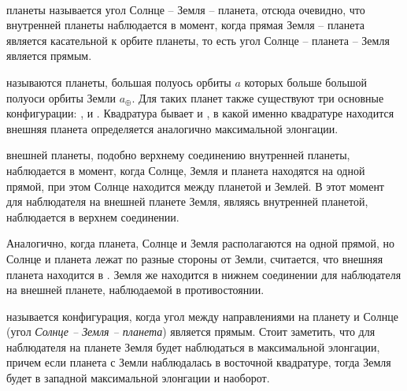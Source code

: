 \begin{minipage}{0.63\tw}
%
%
%
%
%
%
\end{minipage}\\

 планеты называется угол Солнце -- Земля -- планета, отсюда очевидно, что  внутренней планеты наблюдается в момент, когда прямая Земля -- планета является касательной к орбите планеты, то есть угол Солнце -- планета -- Земля является прямым.

 называются планеты, большая полуось орбиты $a$ которых больше большой полуоси орбиты Земли $a_\oplus$. Для таких планет также существуют три основные конфигурации: ,  и . Квадратура бывает  и , в какой именно квадратуре находится внешняя планета определяется аналогично максимальной элонгации.

 внешней планеты, подобно верхнему соединению внутренней планеты, наблюдается в момент, когда Солнце, Земля и планета находятся на одной прямой, при этом Солнце находится между планетой и Землей. В этот момент для наблюдателя на внешней планете Земля, являясь внутренней планетой, наблюдается в верхнем соединении.

Аналогично, когда планета, Солнце и Земля располагаются на одной прямой, но Солнце и планета лежат по разные стороны от Земли, считается, что внешняя планета находится в . Земля же находится в нижнем соединении для наблюдателя на внешней планете, наблюдаемой в противостоянии.

 называется конфигурация, когда угол между направлениями на планету и Солнце (угол {\slshape Солнце -- Земля -- планета}) является прямым. Стоит заметить, что для наблюдателя на планете Земля будет наблюдаться в максимальной элонгации, причем если планета с Земли наблюдалась в восточной квадратуре, тогда Земля будет в западной максимальной элонгации и наоборот.

